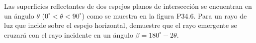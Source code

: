 \item Las superficies reflectantes de dos espejos planos de intersección se encuentran en un ángulo $\theta$ ($0^\circ < \theta < 90^\circ$) como se muestra en la figura P34.6. Para un rayo de luz que incide sobre el espejo horizontal, demuestre que el rayo emergente se cruzará con el rayo incidente en un ángulo $\beta = 180^\circ - 2\theta$.